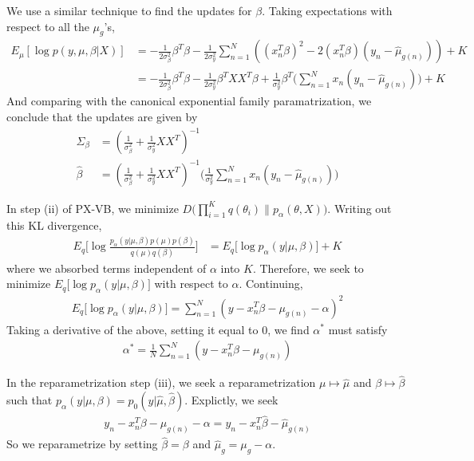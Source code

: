 \documentclass{article}
\begin{document}
We use a similar technique to find the updates for $\beta$. Taking expectations with respect to all the $\mu_g$'s, 
\begin{align*}
E_\mu[\log p(y, \mu, \beta | X) ] &=  -\frac{1}{2\sigma^2_\beta}\beta^T\beta  - \frac{1}{2\sigma^2_y}\sum_{n=1}^N ((x_n^T\beta)^2 - 2(x_n^T\beta)(y_n - \hat\mu_{g(n)} )) + K\\
	&=  -\frac{1}{2\sigma^2_\beta}\beta^T\beta  - \frac{1}{2\sigma^2_y} \beta^TXX^T\beta + \frac{1}{\sigma^2_y}\beta^T\Big(\sum_{n=1}^N  x_n(y_n - \hat\mu_{g(n)} )\Big) + K
\end{align*}
And comparing with the canonical exponential family paramatrization, we conclude that the updates are given by
\begin{align*}
\Sigma_\beta &= (\frac{1}{\sigma^2_\beta} + \frac{1}{\sigma^2_y}XX^T)^{-1}\\
\hat\beta &= (\frac{1}{\sigma^2_\beta} + \frac{1}{\sigma^2_y}XX^T)^{-1}\Big(\frac{1}{\sigma^2_y}\sum_{n=1}^N  x_n(y_n - \hat\mu_{g(n)} )\Big)
\end{align*}


In step (ii) of PX-VB, we minimize $D\big( \prod_{i=1}^K q(\theta_i) \| p_{\alpha}(\theta, X) \big)$. Writing out this KL divergence, 
\begin{align}
E_q\Big[ \log \frac{p_\alpha(y|\mu, \beta) p(\mu)p(\beta)}{q(\mu)q(\beta)}\Big] &= E_q\Big[\log p_\alpha(y|\mu, \beta)\Big] + K
\end{align}
where we absorbed terms independent of $\alpha$ into $K$. Therefore, we seek to minimize $E_q\Big[\log p_\alpha(y|\mu, \beta)\Big]$ with respect to $\alpha$. Continuing, 
\begin{align}
E_q\Big[\log p_\alpha(y|\mu, \beta)\Big] = \sum_{n=1}^N (y - x_n^T\beta - \mu_{g(n)} - \alpha)^2
\end{align}
Taking a derivative of the above, setting it equal to 0, we find $\alpha^*$ must satisfy 
\begin{align}
\alpha^* = \frac{1}{N}
\sum_{n=1}^N (y - x_n^T\beta - \mu_{g(n)})  
\end{align}

In the reparametrization step (iii), we seek a reparametrization $\mu\mapsto \hat\mu$ and $\beta\mapsto \hat\beta$ such that $p_\alpha(y | \mu, \beta) = p_0(y | \hat\mu,\hat\beta)$. Explictly, we seek 
\begin{align}
y_n - x_n^T \beta - \mu_{g(n)} - \alpha = y_n - x_n^T \hat\beta - \hat\mu_{g(n)} 
\end{align}
So we reparametrize by setting $\hat\beta = \beta$ and $\hat\mu_g = \mu_g - \alpha$. 
\end{document}
